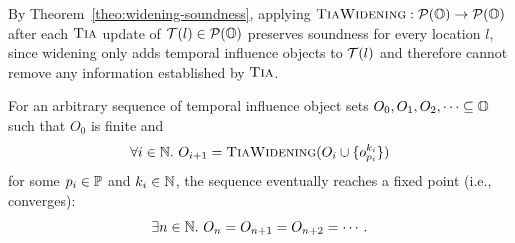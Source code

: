 By Theorem~\ref{theo:widening-soundness}, applying $\textsc{TiaWidening} : \mathcal{P}(\mathbb{O}) \to \mathcal{P}(\mathbb{O})$ after each $\textsc{Tia}$ update of $\mathcal{T}(l) \in \mathcal{P}(\mathbb{O})$ preserves soundness for every location $l$, since widening only adds temporal influence objects to $\mathcal{T}(l)$ and therefore cannot remove any information established by $\textsc{Tia}$.

\begin{theorem}\label{theo:widening-convergence}
    For an arbitrary sequence of temporal influence object sets $O_0,O_1,O_2,\dots \subseteq \mathbb{O}$ such that $O_0$ is finite and
    \[
    \forall i \in \mathbb{N}.\ O_{i+1} = \textsc{TiaWidening}(O_i \cup \{o_{p_i}^{k_i}\})
    \]
    for some $p_i \in \mathbb{P}$ and $k_i \in \mathbb{N}$, the sequence eventually reaches a fixed point (i.e., converges):
    \[
    \exists n \in \mathbb{N}.\ O_n = O_{n+1} = O_{n+2} = \cdots.
    \]
\end{theorem}
